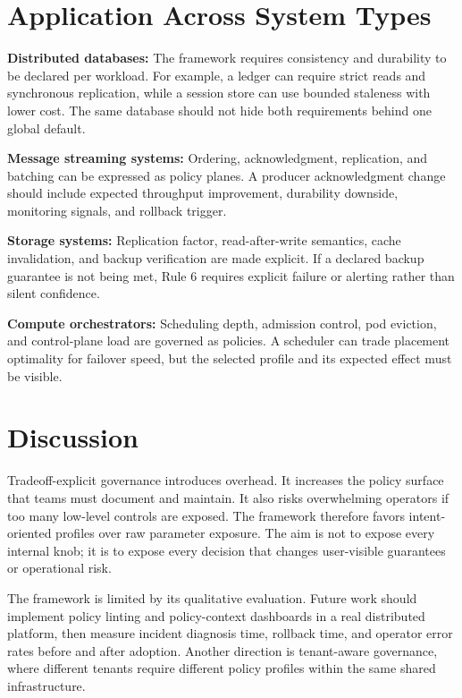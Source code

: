\documentclass[conference]{IEEEtran}
\begin{document}
\section{Application Across System Types}

\textbf{Distributed databases:} The framework requires consistency and durability to be declared per workload. For example, a ledger can require strict reads and synchronous replication, while a session store can use bounded staleness with lower cost. The same database should not hide both requirements behind one global default.

\textbf{Message streaming systems:} Ordering, acknowledgment, replication, and batching can be expressed as policy planes. A producer acknowledgment change should include expected throughput improvement, durability downside, monitoring signals, and rollback trigger.

\textbf{Storage systems:} Replication factor, read-after-write semantics, cache invalidation, and backup verification are made explicit. If a declared backup guarantee is not being met, Rule 6 requires explicit failure or alerting rather than silent confidence.

\textbf{Compute orchestrators:} Scheduling depth, admission control, pod eviction, and control-plane load are governed as policies. A scheduler can trade placement optimality for failover speed, but the selected profile and its expected effect must be visible.

\section{Discussion}

Tradeoff-explicit governance introduces overhead. It increases the policy surface that teams must document and maintain. It also risks overwhelming operators if too many low-level controls are exposed. The framework therefore favors intent-oriented profiles over raw parameter exposure. The aim is not to expose every internal knob; it is to expose every decision that changes user-visible guarantees or operational risk.

The framework is limited by its qualitative evaluation. Future work should implement policy linting and policy-context dashboards in a real distributed platform, then measure incident diagnosis time, rollback time, and operator error rates before and after adoption. Another direction is tenant-aware governance, where different tenants require different policy profiles within the same shared infrastructure.
\end{document}
